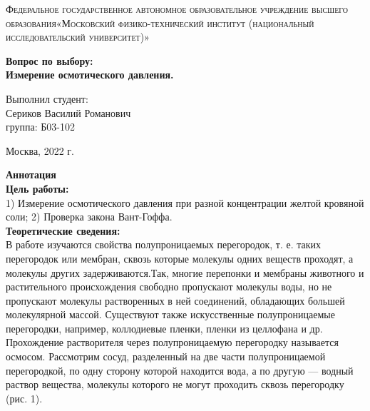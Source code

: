 \documentclass[a4paper, 12pt]{article}%
\begin{document}
	\begin{titlepage}
		\begin{center}
			\textsc{Федеральное государственное автономное образовательное учреждение высшего образования«Московский физико-технический институт (национальный исследовательский университет)»\\[5mm]
			}
			
			\vfill
			
			\textbf{Вопрос по выбору: \\[3mm]
			Измерение осмотического давления.
				\\[50mm]
			}
			
		\end{center}
		
		\hfill
		\begin{minipage}{.5\textwidth}
			Выполнил студент:\\[2mm]
			Сериков Василий Романович\\[2mm]
			группа: Б03-102\\[5mm]
			
		\end{minipage}
		\vfill
		\begin{center}
			Москва, 2022 г.
		\end{center}
		
	\end{titlepage}
	
	\newpage
	\textbf{Аннотация}\\
	
	
	\textbf{Цель работы: }\\
	
	1) Измерение осмотического давления при разной
	концентрации желтой кровяной соли; 2) Проверка закона Вант-Гоффа.\\
	
	
	\textbf{Теоретические сведения: } \\
	
	В работе изучаются свойства полупроницаемых перегородок, т. е. таких перегородок или мембран, сквозь
	которые молекулы одних веществ проходят, а молекулы других задерживаются.Так, многие перепонки и мембраны животного и растительного происхождения свободно пропускают молекулы воды, но не пропускают молекулы растворенных в ней соединений, обладающих большей молекулярной массой. Существуют также искусственные полупроницаемые перегородки, например, коллодиевые пленки, пленки из целлофана и др. Прохождение растворителя через полупроницаемую перегородку называется осмосом.
	Рассмотрим сосуд, разделенный на две части полупроницаемой перегородкой, по одну сторону которой находится вода,
	а по другую	— водный раствор вещества, молекулы
	которого не могут проходить сквозь перегородку (рис. 1).
	
\end{document}
